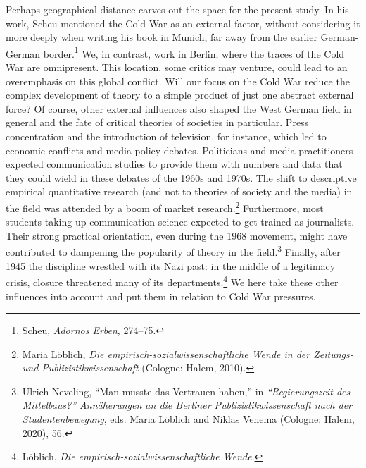 \documentclass{tufte-handout}
\begin{document}
Perhaps geographical distance carves out the space for the present
study. In his work, Scheu mentioned the Cold War as an external factor,
without considering it more deeply when writing his book in Munich, far
away from the earlier German-German border.\footnote{Scheu,
  \emph{Adornos Erben}, 274--75.} We, in contrast, work in Berlin, where
the traces of the Cold War are omnipresent. This location, some critics
may venture, could lead to an overemphasis on this global conflict. Will
our focus on the Cold War reduce the complex development of theory to a
simple product of just one abstract external force? Of course, other
external influences also shaped the West German field in general and the
fate of critical theories of societies in particular. Press
concentration and the introduction of television, for instance, which
led to economic conflicts and media policy debates. Politicians and
media practitioners expected communication studies to provide them with
numbers and data that they could wield in these debates of the 1960s and
1970s. The shift to descriptive empirical quantitative research (and not
to theories of society and the media) in the field was attended by a
boom of market research.\footnote{Maria Löblich, \emph{Die
  empirisch-sozialwissenschaftliche Wende in der Zeitungs- und
  Publizistikwissenschaft} (Cologne: Halem, 2010).} Furthermore, most
students taking up communication science expected to get trained as
journalists. Their strong practical orientation, even during the 1968
movement, might have contributed to dampening the popularity of theory
in the field.\footnote{Ulrich Neveling, ``Man musste das Vertrauen
  haben,'' in \emph{``Regierungszeit des Mittelbaus?'' Annäherungen an
  die Berliner Publizistikwissenschaft nach der Studentenbewegung}, eds.
  Maria Löblich and Niklas Venema (Cologne: Halem, 2020), 56.} Finally,
after 1945 the discipline wrestled with its Nazi past: in the middle of
a legitimacy crisis, closure threatened many of its
departments.\footnote{Löblich, \emph{Die
  empirisch-sozialwissenschaftliche Wende}.} We here take these other
influences into account and put them in relation to Cold War pressures.
\end{document}
